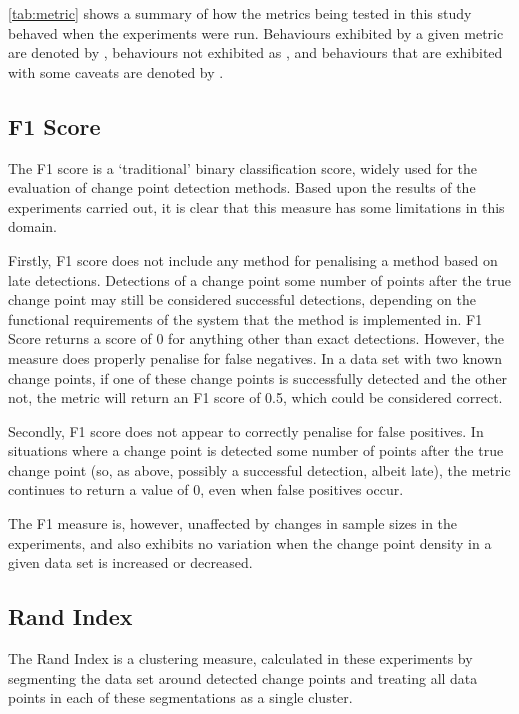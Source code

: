 \documentclass{uvamscse}	%
\newcommand{\cmark}{\ding{51}}%
\newcommand{\xmark}{\ding{55}}%
\newcommand{\mmark}{\ding{108}}%
\begin{document}

\autoref{tab:metric} shows a summary of how the metrics being tested in this study behaved when the experiments were run. Behaviours exhibited by a given metric are denoted by \cmark, behaviours not exhibited as \xmark, and behaviours that are exhibited with some caveats are denoted by \mmark.

\subsection{F1 Score}

The F1 score is a `traditional' binary classification score, widely used for the evaluation of change point detection methods. Based upon the results of the experiments carried out, it is clear that this measure has some limitations in this domain.

Firstly, F1 score does not include any method for penalising a method based on late detections. Detections of a change point some number of points after the true change point may still be considered successful detections, depending on the functional requirements of the system that the method is implemented in. F1 Score returns a score of 0 for anything other than exact detections. However, the measure does properly penalise for false negatives. In a data set with two known change points, if one of these change points is successfully detected and the other not, the metric will return an F1 score of 0.5, which could be considered correct.

Secondly, F1 score does not appear to correctly penalise for false positives. In situations where a change point is detected some number of points after the true change point (so, as above, possibly a successful detection, albeit late), the metric continues to return a value of 0, even when false positives occur.

The F1 measure is, however, unaffected by changes in sample sizes in the experiments, and also exhibits no variation when the change point density in a given data set is increased or decreased.

\subsection{Rand Index}

The Rand Index is a clustering measure, calculated in these experiments by segmenting the data set around detected change points and treating all data points in each of these segmentations as a single cluster.
\end{document}
